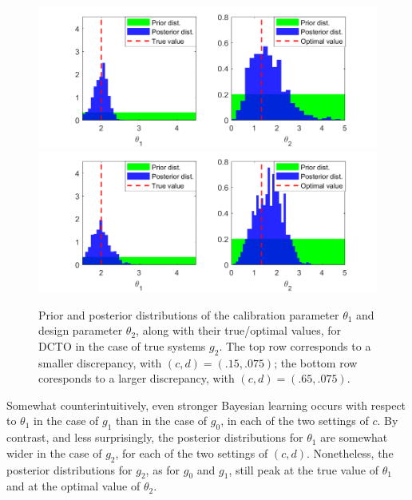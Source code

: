 \documentclass[12pt]{article}
\begin{document}
\begin{figure}
\centering
\includegraphics[scale=0.85]{FIG_discrepancy3_results}
\includegraphics[scale=0.85]{FIG_discrepancy4_results}
\captionsetup{width=.85\linewidth}
\caption{Prior and posterior distributions of the calibration parameter $\theta_1$ and design parameter $\theta_2$, along with their true/optimal values, for DCTO in the case of true systems $g_2$. The top row corresponds to a smaller discrepancy, with $(c,d)=(.15,.075)$; the bottom row coresponds to a larger discrepancy, with $(c,d)=(.65,.075)$.}
\label{fig:2_discrep_results}
\end{figure}
%
Somewhat counterintuitively, even stronger Bayesian learning occurs with respect to $\theta_1$ in the case of $g_1$ than in the case of $g_0$, in each of the two settings of $c$.
%
By contrast, and less surprisingly, the posterior distributions for $\theta_1$ are somewhat wider in the case of $g_2$, for each of the two settings of $(c,d)$.
%
Nonetheless, the posterior distributions for $g_2$, as for $g_0$ and $g_1$, still peak at the true value of $\theta_1$ and at the optimal value of $\theta_2$.
%
\end{document}
